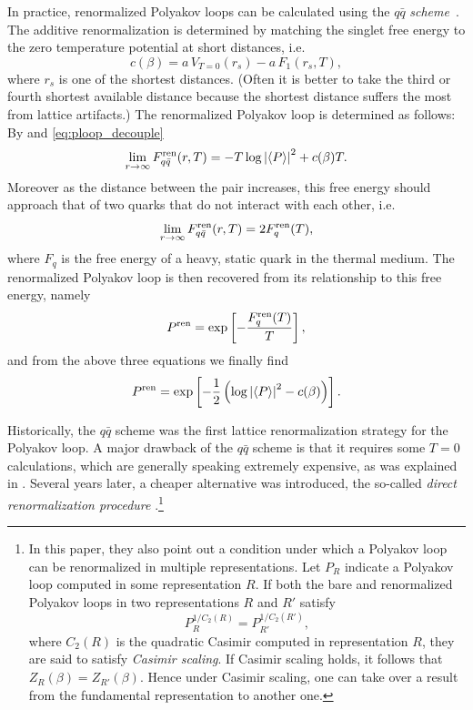 In practice, renormalized Polyakov loops can be calculated using
the $q\bar{q}$ {\it scheme}~\cite{kaczmarek_heavy_2002}. The additive
renormalization is determined by matching the singlet free energy
to the zero temperature potential at short distances, i.e.
\begin{equation}
  c(\beta)=a\,V_{T=0}(r_s)-a\,F_1(r_s,T),
\end{equation}
where $r_s$ is one of the shortest distances. (Often it is better to take
the third or fourth shortest available distance because the shortest
distance suffers the most from lattice artifacts.) The renormalized
Polyakov loop is determined as follows:
By  and \eqref{eq:ploop_decouple}
\begin{equation}
  \lim_{r\to\infty}F_{q\bar{q}}\ren(r,T)
             =-T\log\left|\ev{P}\right|^2+c(\beta)T.
\end{equation}
Moreover as the distance between the pair increases, this free energy
should approach that of two quarks that do not interact with each other, i.e.
\begin{equation}
  \lim_{r\to\infty}F_{q\bar{q}}^{\rm ren}(r,T)=2F_q^{\rm ren}(T),
\end{equation}
where $F_q$ is the free energy of a heavy, static quark in the thermal
medium. The renormalized Polyakov loop is then recovered from its
relationship to this free energy, namely
\begin{equation}
  P^{\rm ren}=\exp\left[-\frac{F_q^{\rm ren}(T)}{T}\right],
\end{equation}
and from the above three equations we finally find
\begin{equation}
  P\ren=\exp\left[-\frac{1}{2}\left(\log\left|\ev{P}\right|^2
                                             -c(\beta)\right)\right].
\end{equation}

Historically, the $q\bar{q}$ scheme was the first lattice renormalization
strategy for the Polyakov loop. A major drawback of the $q\bar{q}$ scheme
is that it requires some $T=0$ calculations, which are generally speaking
extremely expensive, as was explained in .
Several years later, a cheaper alternative was introduced, the so-called {\it
direct renormalization procedure}
\cite{gupta_renormalized_2008}.\footnote{ In this paper, they also 
point out a condition under which a Polyakov loop can be
renormalized in multiple representations.
Let $P_R$ indicate a Polyakov loop computed in some
representation $R$. If both the bare and renormalized Polyakov loops 
in two representations $R$ and $R'$ satisfy
$$
P_R^{1/C_2(R)}=P_{R'}^{1/C_2(R')},
$$
where $C_2(R)$ is the quadratic Casimir computed in representation $R$,
they are said to satisfy {\it Casimir scaling}.
If Casimir scaling holds, it follows that $Z_R(\beta)=Z_{R'}(\beta)$.
Hence under Casimir scaling, one can take over a result from the fundamental
representation to another one.}

